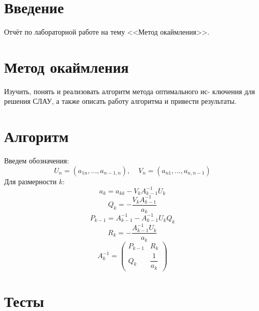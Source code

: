 \documentclass[14pt, titlepage,fleqn]{extarticle}
\begin{document}
	

	
	
	\newpage
	
	\tableofcontents   
	\clearpage
	\section*{Введение}
	Отчёт по лабораторной работе на тему <<Метод окаймления>>.	
	\newpage









	\section*{Метод окаймления}
	Изучить, понять и реализовать алгоритм метода оптимального ис-
	ключения для решения СЛАУ, а также описать работу алгоритма и
	привести результаты.

	\section*{Алгоритм}
	Введем обозначения:
	\[U_n = (a_{1n},...,a_{n-1,n}), ~~~~~ V_n =(a_{n1},...,a_{n,n-1})\]
	Для размерности $k$:
	\[a_k = a_{kk} - V_kA^{-1}_{k-1}U_k\]
	\[Q_k = - \dfrac{V_kA^{-1}_{k-1}}{a_k}\]
	\[P_{k-1} = A^{-1}_{k-1} - A^{-1}_{k-1}U_kQ_k\]
	\[R_k = - \dfrac{A^{-1}_{k-1}U_k}{a_k}\]
	\[A^{-1}_k = \begin{pmatrix}
		P_{k-1} & R_k\\
		Q_k & \dfrac{1}{a_k}
	\end{pmatrix}\]
	
	\section*{Тесты}
\end{document}
